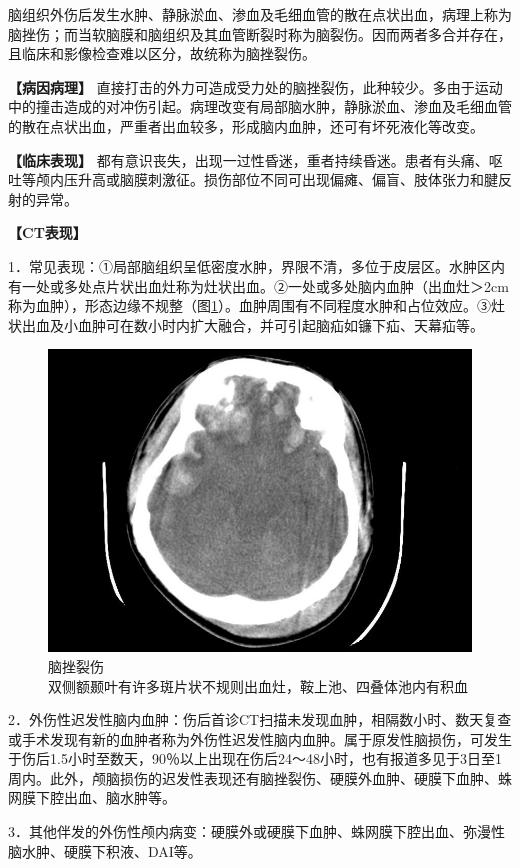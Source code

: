 脑组织外伤后发生水肿、静脉淤血、渗血及毛细血管的散在点状出血，病理上称为脑挫伤；而当软脑膜和脑组织及其血管断裂时称为脑裂伤。因而两者多合并存在，且临床和影像检查难以区分，故统称为脑挫裂伤。

\textbf{【病因病理】}
直接打击的外力可造成受力处的脑挫裂伤，此种较少。多由于运动中的撞击造成的对冲伤引起。病理改变有局部脑水肿，静脉淤血、渗血及毛细血管的散在点状出血，严重者出血较多，形成脑内血肿，还可有坏死液化等改变。

\textbf{【临床表现】}
都有意识丧失，出现一过性昏迷，重者持续昏迷。患者有头痛、呕吐等颅内压升高或脑膜刺激征。损伤部位不同可出现偏瘫、偏盲、肢体张力和腱反射的异常。

\textbf{【CT表现】}

1．常见表现：①局部脑组织呈低密度水肿，界限不清，多位于皮层区。水肿区内有一处或多处点片状出血灶称为灶状出血。②一处或多处脑内血肿（出血灶＞2cm称为血肿），形态边缘不规整（图\ref{fig2-34}）。血肿周围有不同程度水肿和占位效应。③灶状出血及小血肿可在数小时内扩大融合，并可引起脑疝如镰下疝、天幕疝等。

\begin{figure}[!htbp]
 \centering
 \includegraphics[width=.7\textwidth,height=\textheight,keepaspectratio]{./images/Image00055.jpg}
 \captionsetup{justification=centering}
 \caption{脑挫裂伤\\{\small 双侧额颞叶有许多斑片状不规则出血灶，鞍上池、四叠体池内有积血}}
 \label{fig2-34}
  \end{figure} 

2．外伤性迟发性脑内血肿：伤后首诊CT扫描未发现血肿，相隔数小时、数天复查或手术发现有新的血肿者称为外伤性迟发性脑内血肿。属于原发性脑损伤，可发生于伤后1.5小时至数天，90％以上出现在伤后24～48小时，也有报道多见于3日至1周内。此外，颅脑损伤的迟发性表现还有脑挫裂伤、硬膜外血肿、硬膜下血肿、蛛网膜下腔出血、脑水肿等。

3．其他伴发的外伤性颅内病变：硬膜外或硬膜下血肿、蛛网膜下腔出血、弥漫性脑水肿、硬膜下积液、DAI等。


